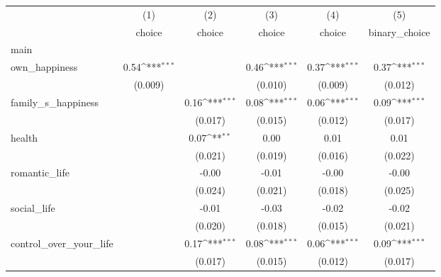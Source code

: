 {
\def\sym#1{\ifmmode^{#1}\else\(^{#1}\)\fi}
\begin{tabular}{l*{5}{c}}
\hline\hline
            &\multicolumn{1}{c}{(1)}&\multicolumn{1}{c}{(2)}&\multicolumn{1}{c}{(3)}&\multicolumn{1}{c}{(4)}&\multicolumn{1}{c}{(5)}\\
            &\multicolumn{1}{c}{choice}&\multicolumn{1}{c}{choice}&\multicolumn{1}{c}{choice}&\multicolumn{1}{c}{choice}&\multicolumn{1}{c}{binary\_choice}\\
\hline
main        &                     &                     &                     &                     &                     \\
own\_happiness&        0.54\sym{***}&                     &        0.46\sym{***}&        0.37\sym{***}&        0.37\sym{***}\\
            &     (0.009)         &                     &     (0.010)         &     (0.009)         &     (0.012)         \\
[1em]
family\_s\_happiness&                     &        0.16\sym{***}&        0.08\sym{***}&        0.06\sym{***}&        0.09\sym{***}\\
            &                     &     (0.017)         &     (0.015)         &     (0.012)         &     (0.017)         \\
[1em]
health      &                     &        0.07\sym{**} &        0.00         &        0.01         &        0.01         \\
            &                     &     (0.021)         &     (0.019)         &     (0.016)         &     (0.022)         \\
[1em]
romantic\_life&                     &       -0.00         &       -0.01         &       -0.00         &       -0.00         \\
            &                     &     (0.024)         &     (0.021)         &     (0.018)         &     (0.025)         \\
[1em]
social\_life &                     &       -0.01         &       -0.03         &       -0.02         &       -0.02         \\
            &                     &     (0.020)         &     (0.018)         &     (0.015)         &     (0.021)         \\
[1em]
control\_over\_your\_life&                     &        0.17\sym{***}&        0.08\sym{***}&        0.06\sym{***}&        0.09\sym{***}\\
            &                     &     (0.017)         &     (0.015)         &     (0.012)         &     (0.017)         \\

\end{tabular}}
